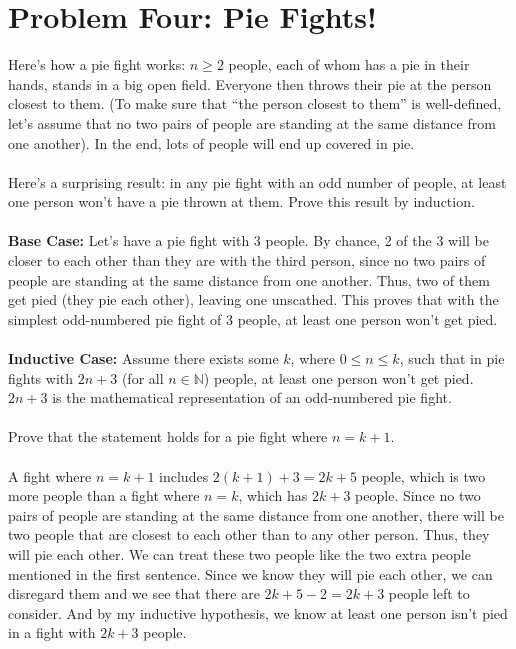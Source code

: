\documentclass{article}
\begin{document}
\section*{Problem Four: Pie Fights!}
Here's how a pie fight works: $n \geqslant 2$ people, each of whom has a pie in their hands, stands in a big open field. Everyone then throws their pie at the person closest to them. (To make sure that “the person closest to them” is well-defined, let's assume that no two pairs of people are standing at the same distance from one another). In the end, lots of people will end up covered in pie.
\\
\\Here's a surprising result: in any pie fight with an odd number of people, at least one person won't have a pie thrown at them. Prove this result by induction.
\\
\\\textbf{Base Case:} Let's have a pie fight with 3 people. By chance, 2 of the 3 will be closer to each other than they are with the third person, since no two pairs of people are standing at the same distance from one another. Thus, two of them get pied (they pie each other), leaving one unscathed. This proves that with the simplest odd-numbered pie fight of 3 people, at least one person won't get pied.
\\
\\\textbf{Inductive Case:} Assume there exists some $k$, where $0 \leqslant n \leqslant k$, such that in pie fights with $2n + 3$ (for all $n \in \mathbb{N}$) people, at least one person won't get pied. $2n + 3$ is the mathematical representation of an odd-numbered pie fight.
\\
\\Prove that the statement holds for a pie fight where $n = k + 1$.
\\
\\A fight where $n = k + 1$ includes $2(k + 1) + 3 = 2k + 5$ people, which is two more people than a fight where $n = k$, which has $2k + 3$ people. Since no two pairs of people are standing at the same distance from one another, there will be two people that are closest to each other than to any other person. Thus, they will pie each other. We can treat these two people like the two extra people mentioned in the first sentence. Since we know they will pie each other, we can disregard them and we see that there are $2k + 5 - 2 = 2k + 3$ people left to consider. And by my inductive hypothesis, we know at least one person isn't pied in a fight with $2k +3$ people. 
\end{document}
